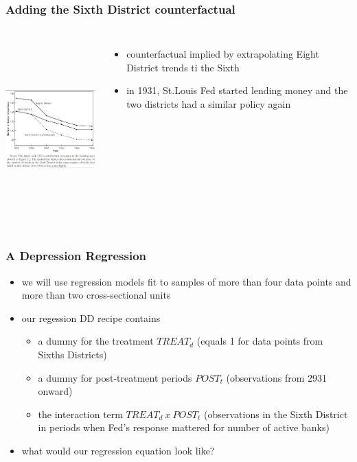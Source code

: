 \documentclass{beamer}
\begin{document}
\begin{frame}
\frametitle{Adding the Sixth District counterfactual }

 \begin{columns}
\includegraphics[width=6cm,height=7cm,keepaspectratio]{Figure 5.3} 

\begin{itemize}
	\item counterfactual implied by extrapolating Eight District trends ti the Sixth
	\item in 1931, St.Louis Fed started lending money and the two districts had a similar policy again

\end{itemize}

\end{columns}

\end{frame}


\begin{frame}
\frametitle{A Depression Regression}
\begin{itemize}
	\item we will use regression models fit to samples of more than four data points and more than two cross-sectional units
	\item our regession DD recipe contains
		\begin{itemize}
			\item a dummy for the treatment $TREAT_d$ (equals 1 for data points from Sixths Districts)
			\item a dummy for post-treatment periods $POST_t$ (observations from 2931 onward)
			\item the interaction term $TREAT_d~x~POST_t$ (observations in the Sixth District in periods when Fed's response mattered for number of active banks)
		\end{itemize}
	\item what would our regression equation look like?
\end{itemize}

\end{frame}
\end{document}

